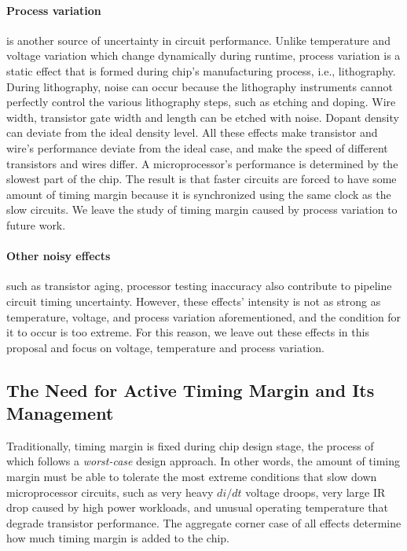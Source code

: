 \paragraph{Process variation} is another source of uncertainty in circuit performance. Unlike temperature and voltage variation which change dynamically during runtime, process variation is a static effect that is formed during chip's manufacturing process, i.e., lithography. During lithography, noise can occur because the lithography instruments cannot perfectly control the various lithography steps, such as etching and doping. Wire width, transistor gate width and length can be etched with noise. Dopant density can deviate from the ideal density level. All these effects make transistor and wire's performance deviate from the ideal case, and make the speed of different transistors and wires differ. A microprocessor's performance is determined by the slowest part of the chip. The result is that faster circuits are forced to have some amount of timing margin because it is synchronized using the same clock as the slow circuits. We leave the study of timing margin caused by process variation to future work.

\paragraph{Other noisy effects} such as transistor aging, processor testing inaccuracy also contribute to pipeline circuit timing uncertainty. However, these effects' intensity is not as strong as temperature, voltage, and process variation aforementioned, and the condition for it to occur is too extreme. For this reason, we leave out these effects in this proposal and focus on voltage, temperature and process variation.

\subsection{The Need for Active Timing Margin and Its Management}
\label{sec:motivation:energy}

Traditionally, timing margin is fixed during chip design stage, the process of which follows a \textit{worst-case} design approach. In other words, the amount of timing margin must be able to tolerate the most extreme conditions that slow down microprocessor circuits, such as very heavy $di/dt$ voltage droops, very large IR drop caused by high power workloads, and unusual operating temperature that degrade transistor performance. The aggregate corner case of all effects determine how much timing margin is added to the chip.

